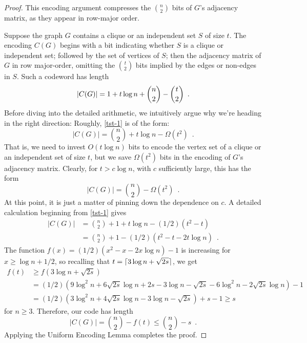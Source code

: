 \documentclass[format=acmsmall, review=false, screen=true]{acmart}
\begin{document}
\begin{proof}
  This encoding argument compresses the $\binom{n}{2}$ bits
  of $G$'s adjacency matrix, as they appear in row-major order.
  
  Suppose the graph $G$ contains a clique or an independent set $S$ of size
  $t$. The encoding $C(G)$ begins with a bit indicating whether $S$
  is a clique or independent set; followed by the set of vertices of $S$; 
  then the
  adjacency matrix of $G$ in row major-order, omitting
  the $\binom{t}{2}$ bits implied by the edges or non-edges in
  $S$. Such a codeword has length
  \begin{equation} 
    |C(G)|  = 1 + t\log n + \binom{n}{2}-\binom{t}{2} \enspace .  
    \eqlabel{tst-1}
  \end{equation}
  Before diving into the detailed arithmetic, we intuitively
  argue why we're heading in the right direction: Roughly,
  \eqref{tst-1} is of the form:
  \[ |C(G)|  = \binom{n}{2} + t\log n - \varOmega(t^2) \enspace . \]
  That is, we need to invest $O(t\log n)$ bits
  to encode the vertex set of a clique or an independent set of 
  size $t$, but we save $\varOmega(t^2)$ bits in the encoding of $G$'s 
  adjacency matrix.
  Clearly, for $t>c\log n$, with $c$ sufficiently large, this has the form 
  \[ |C(G)|  = \binom{n}{2} - \varOmega(t^2) \enspace . \]
  At this point, it is just a matter of pinning down the dependence on $c$.
  A detailed calculation beginning from \eqref{tst-1} gives
  \begin{align*}
    |C(G)| 
    & = \binom{n}{2} + 1 + t\log n - (1/2)(t^2 - t) \\
    & = \binom{n}{2} + 1 - (1/2)(t^2 - t - 2t \log n) \enspace .
  \end{align*}
  The function $f(x) = (1/2)(x^2 - x - 2x \log n) - 1$ is increasing
  for $x \geq \log n + 1/2$, so recalling that
$t = {\lceil 3\log n + \sqrt{2s} \rceil}$, we get
  \begin{align*}
    f(t) &\ge f(3\log n + \sqrt{2s}) \\
    &= (1/2)(9 \log^2 n + 6 \sqrt{2s} \log n + 2s - 3 \log n - \sqrt{2s} - 6 \log^2 n - 2 \sqrt{2s} \log n) - 1 \\
    &= (1/2)(3 \log^2 n + 4 \sqrt{2s} \log n - 3 \log n - \sqrt{2s}) + 
    s - 1  \ge s
  \end{align*}
  for $n \ge 3$. Therefore, our code has length
  \[
    |C(G)| = \binom{n}{2} - f(t) \le \binom{n}{2} - s \enspace .
  \]
  Applying the Uniform Encoding Lemma completes the proof.
\end{proof}
\end{document}
